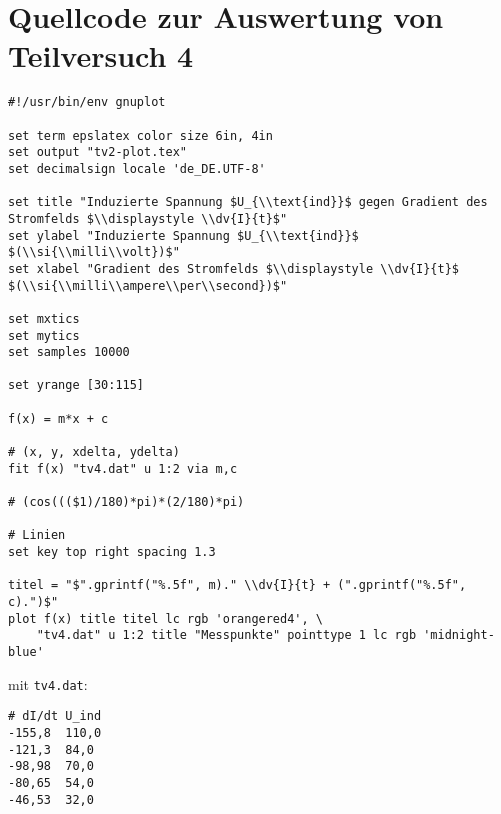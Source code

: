 \section{\gnuplot{} Quellcode zur Auswertung von Teilversuch 4}
    \label{appdx:gnuplottv4}
    {  
        \renewcommand{\fcolorbox}[4][]{#4}
        \begin{verbatim}
#!/usr/bin/env gnuplot

set term epslatex color size 6in, 4in
set output "tv2-plot.tex"
set decimalsign locale 'de_DE.UTF-8'

set title "Induzierte Spannung $U_{\\text{ind}}$ gegen Gradient des Stromfelds $\\displaystyle \\dv{I}{t}$"
set ylabel "Induzierte Spannung $U_{\\text{ind}}$ $(\\si{\\milli\\volt})$"
set xlabel "Gradient des Stromfelds $\\displaystyle \\dv{I}{t}$ $(\\si{\\milli\\ampere\\per\\second})$"

set mxtics
set mytics
set samples 10000

set yrange [30:115]

f(x) = m*x + c

# (x, y, xdelta, ydelta)
fit f(x) "tv4.dat" u 1:2 via m,c

# (cos((($1)/180)*pi)*(2/180)*pi)

# Linien
set key top right spacing 1.3

titel = "$".gprintf("%.5f", m)." \\dv{I}{t} + (".gprintf("%.5f", c).")$"
plot f(x) title titel lc rgb 'orangered4', \
    "tv4.dat" u 1:2 title "Messpunkte" pointtype 1 lc rgb 'midnight-blue'
        \end{verbatim}
    }
    mit \texttt{tv4.dat}:
    \begin{verbatim}
# dI/dt U_ind
-155,8  110,0
-121,3  84,0 
-98,98  70,0 
-80,65  54,0 
-46,53  32,0 
    \end{verbatim}
